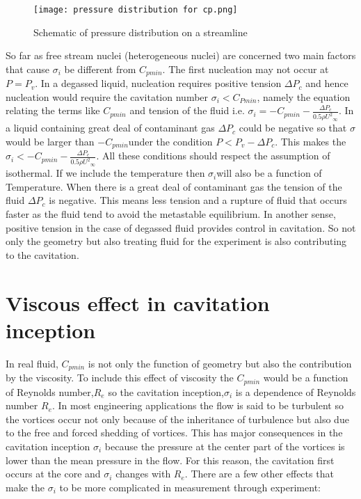 \begin{figure}[H]
    \centering
    \texttt{[image: pressure distribution for cp.png]}
    \caption{Schematic of pressure distribution on a streamline\cite{FundamentalsofCavitation.2004}}
    \label{fig:fig5}
\end{figure}
So far as free stream nuclei (heterogeneous nuclei) are concerned
two main factors that cause ${\sigma}_i$ be different from $C_{pmin}$.
The first nucleation may not occur at $P=P_v$. In a degassed liquid,
nucleation requires positive tension $\Delta P_c$ and hence nucleation
would require the cavitation number ${{\sigma}_i} <$$C_{Pmin}$, namely
the equation relating the terms like $C_{pmin}$ and tension of the
fluid i.e.  ${{\sigma}_i}=$${-C_{pmin}}-$$\frac {{\Delta}P_c}{0.5 \rho
  {{{U}^2}_\infty}}$. In a liquid containing great deal of contaminant
gas $\Delta P_c$ could be negative so that ${\sigma}$ would be larger
than ${-C_{pmin}}$under the condition $P<{P_v}-$${\Delta}P_c$. This
makes the ${{\sigma}_i}<$${-C_{pmin}}-$$\frac {{\Delta}P_c}{0.5 \rho
  {{{U}^2}_\infty}}$. All these conditions should respect the
assumption of isothermal. If we include the temperature then
${\sigma}_i$will also be a function of Temperature. When there is a great deal of contaminant gas the
tension of the fluid ${\Delta}P_c$ is negative. This means less
tension and a rupture of fluid that occurs faster as the fluid tend to avoid the metastable
equilibrium. In another sense, positive tension in the case of
degassed fluid provides control in cavitation. So not only the
geometry but also treating fluid for the experiment is also
contributing to the cavitation.

\section{Viscous effect in cavitation inception}
In real fluid, $C_{pmin}$ is
not only the function of geometry but also the contribution by the
viscosity. To include this effect of viscosity the $C_{pmin}$ would be
a function of Reynolds number,$R_e$ so the cavitation
inception,${\sigma}_i$ is a dependence of Reynolds number $R_e$. In
most engineering applications the flow is said to be turbulent so
the vortices occur not only because of the inheritance of turbulence
but also due to the free and forced shedding of vortices. This has major
consequences in the cavitation inception ${\sigma}_i$ because the
pressure at the center part of the vortices is lower than the mean
pressure in the flow. For this reason, the cavitation first occurs at the core and
${\sigma}_i$  changes with $R_e$. There are a few other effects that make the
${\sigma}_i$ to be more complicated in measurement through experiment:


